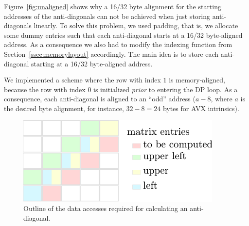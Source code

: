 \documentclass[runningheads,a4paper]{llncs}
\begin{document}
Figure~\ref{fig:unaligned} shows why a 16/32 byte alignment for the starting addresses of the anti-diagonals can not be achieved when just
storing anti-diagonals linearly. To solve this problem, we used padding, that is, we allocate some dummy entries such that
each anti-diagonal starts at a 16/32 byte-aligned address.
As a consequence we also had to modify the indexing function from Section~\ref{ssec:memorylayout} accordingly.
The main idea is to store each anti-diagonal starting at a 16/32 byte-aligned address.



We implemented a scheme where the row with index $1$ is memory-aligned, because the row with index $0$ is initialized {\em prior} to entering the DP loop.
As a consequence, each anti-diagonal is aligned to an ``odd'' address ($a - 8$, where $a$ is the desired byte alignment, for instance, $32 - 8 = 24$ bytes for AVX intrinsics).


\begin{figure}[ht!]
  \centering
  \includegraphics[scale=1.1]{figures/alignment.pdf} \caption{Outline of the
  data accesses required for calculating an anti-diagonal.}
  \label{fig:alignment}
\end{figure}
\end{document}
